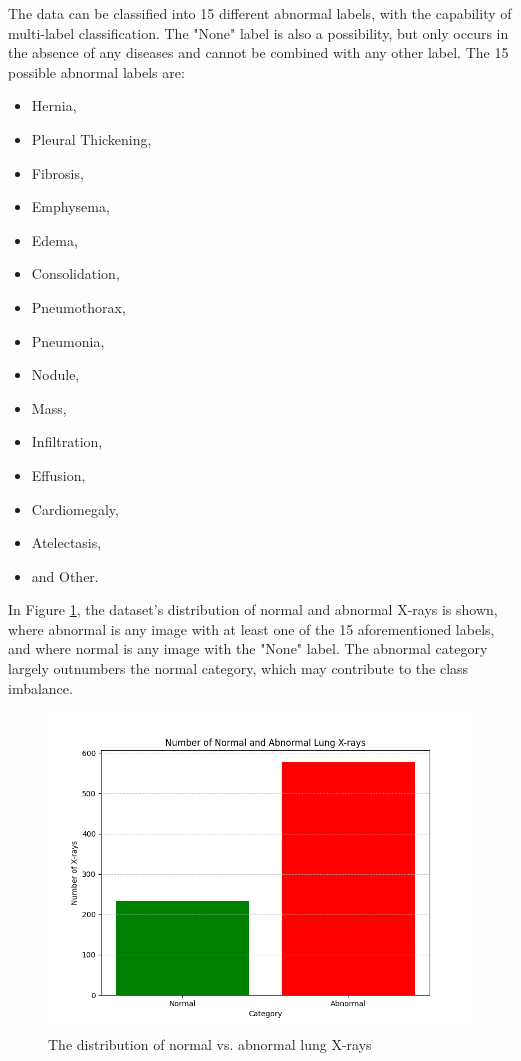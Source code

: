 \documentclass{article}
\theoremstyle{plain}
\theoremstyle{definition}
\theoremstyle{remark}
\begin{document}
The data can be classified into 15 different abnormal labels, with the capability of multi-label classification.
The "None" label is also a possibility, but only occurs in the absence of any diseases and cannot be
combined with any other label. The 15 possible abnormal labels are: 
\begin{itemize}
    \item Hernia,
    \item Pleural Thickening,
    \item Fibrosis,
    \item Emphysema,
    \item Edema,
    \item Consolidation,
    \item Pneumothorax,
    \item Pneumonia,
    \item Nodule,
    \item Mass,
    \item Infiltration,
    \item Effusion,
    \item Cardiomegaly,
    \item Atelectasis,
    \item and Other.
\end{itemize}

In Figure \ref{fig:normalvabnormal}, the dataset's distribution of normal and abnormal X-rays is shown,
where abnormal is any image with at least one of the 15 aforementioned labels, and where
normal is any image with the "None" label. The abnormal category largely outnumbers the normal category,
which may contribute to the class imbalance.

\begin{figure}[!h]
    \centering
    \includegraphics[scale=0.405]{normal_vs_abnormal}
    \caption{The distribution of normal vs. abnormal lung X-rays}
    \label{fig:normalvabnormal}
\end{figure}
\end{document}
